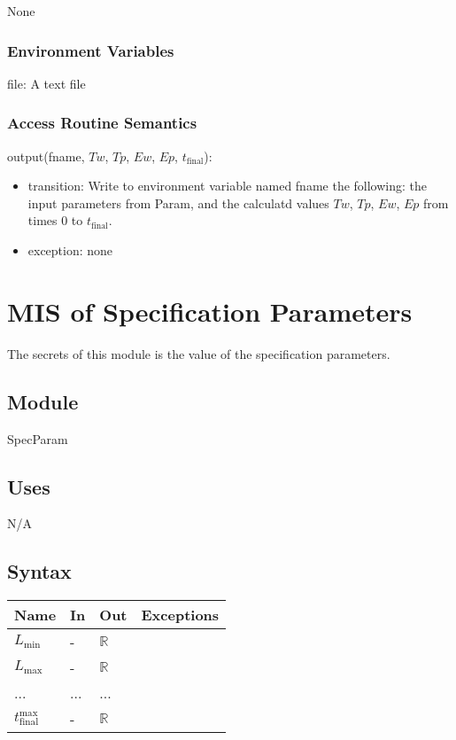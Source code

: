 \documentclass[12pt, titlepage]{article}
\begin{document}
None

\subsubsection{Environment Variables}

file: A text file

\subsubsection{Access Routine Semantics}

\noindent output(fname, $Tw$, $Tp$, $Ew$, $Ep$, $t_\text{final}$):
\begin{itemize}
\item transition:  Write to environment variable named fname the
  following: the input
    parameters from Param, and the calculatd values $Tw$, $Tp$, $Ew$,
    $Ep$ from times $0$ to $t_\text{final}$.
\item exception: none
\end{itemize}

\newpage

\section{MIS of Specification Parameters} \label{SpecParam}

The secrets of this module is the value of the specification parameters.

\subsection{Module}

SpecParam

\subsection{Uses}

N/A

\subsection{Syntax}

\begin{tabular}{p{3cm} p{1cm} p{1cm} >{\raggedright\arraybackslash}p{9cm}}
\toprule
\textbf{Name} & \textbf{In} & \textbf{Out} & \textbf{Exceptions} \\
\midrule
$L_{\text{min}}$ & - & $\mathbb{R}$\\
$L_{\text{max}}$ & - & $\mathbb{R}$\\
... & ... & ...\\
$t_{\text{final}}^{\text{max}}$ & - & $\mathbb{R}$\\
\bottomrule
\end{tabular}
\end{document}
